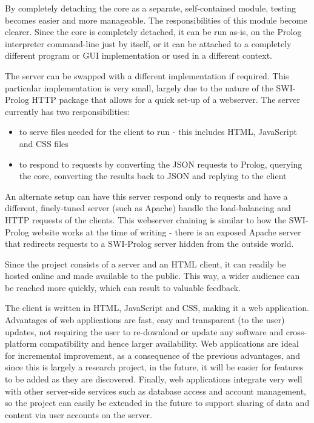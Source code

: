 \documentclass[11pt,twoside,a4paper]{report}
\begin{document}
By completely detaching the core as a separate, self-contained module, testing becomes easier and more manageable. The responsibilities of this module become clearer. Since the core is completely detached, it can be run as-is, on the Prolog interpreter command-line just by itself, or it can be attached to a completely different program or GUI implementation or used in a different context.

The server can be swapped with a different implementation if required. This particular implementation is very small, largely due to the nature of the SWI-Prolog HTTP package that allows for a quick set-up of a webserver. The server currently has two responsibilities:

\begin{itemize}
\item
to serve files needed for the client to run - this includes HTML, JavaScript and CSS files
\item
to respond to requests by converting the JSON requests to Prolog, querying the core, converting the results back to JSON and replying to the client
\end{itemize}

An alternate setup can have this server respond only to requests and have a different, finely-tuned server (such as Apache) handle the load-balancing and HTTP requests of the clients. This webserver chaining is similar to how the SWI-Prolog website works at the time of writing - there is an exposed Apache server that redirects requests to a SWI-Prolog server hidden from the outside world. 

Since the project consists of a server and an HTML client, it can readily be hosted online and made available to the public. This way, a wider audience can be reached more quickly, which can result to valuable feedback.

The client is written in HTML, JavaScript and CSS, making it a web application. Advantages of web applications are fast, easy and transparent (to the user) updates, not requiring the user to re-download or update any software and cross-platform compatibility and hence larger availability. Web applications are ideal for incremental improvement, as a consequence of the previous advantages, and since this is largely a research project, in the future, it will be easier for features to be added as they are discovered. Finally, web applications integrate very well with other server-side services such as database access and account management, so the project can easily be extended in the future to support sharing of data and content via user accounts on the server.
\end{document}

